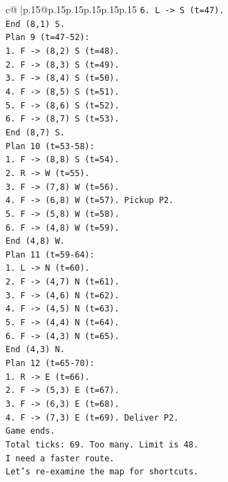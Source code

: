 \documentclass{article}
\begin{document}
{\begin{supertabular}{c@{$\;$}|p{.15\linewidth}@{}p{.15\linewidth}p{.15\linewidth}p{.15\linewidth}p{.15\linewidth}p{.15\linewidth}}
{{{\texttt{6. L {-}> S (t=47).} \\
\texttt{End (8,1) S.} \\
\texttt{Plan 9 (t=47{-}52):} \\
\texttt{1. F {-}> (8,2) S (t=48).} \\
\texttt{2. F {-}> (8,3) S (t=49).} \\
\texttt{3. F {-}> (8,4) S (t=50).} \\
\texttt{4. F {-}> (8,5) S (t=51).} \\
\texttt{5. F {-}> (8,6) S (t=52).} \\
\texttt{6. F {-}> (8,7) S (t=53).} \\
\texttt{End (8,7) S.} \\
\texttt{Plan 10 (t=53{-}58):} \\
\texttt{1. F {-}> (8,8) S (t=54).} \\
\texttt{2. R {-}> W (t=55).} \\
\texttt{3. F {-}> (7,8) W (t=56).} \\
\texttt{4. F {-}> (6,8) W (t=57). Pickup P2.} \\
\texttt{5. F {-}> (5,8) W (t=58).} \\
\texttt{6. F {-}> (4,8) W (t=59).} \\
\texttt{End (4,8) W.} \\
\texttt{Plan 11 (t=59{-}64):} \\
\texttt{1. L {-}> N (t=60).} \\
\texttt{2. F {-}> (4,7) N (t=61).} \\
\texttt{3. F {-}> (4,6) N (t=62).} \\
\texttt{4. F {-}> (4,5) N (t=63).} \\
\texttt{5. F {-}> (4,4) N (t=64).} \\
\texttt{6. F {-}> (4,3) N (t=65).} \\
\texttt{End (4,3) N.} \\
\texttt{Plan 12 (t=65{-}70):} \\
\texttt{1. R {-}> E (t=66).} \\
\texttt{2. F {-}> (5,3) E (t=67).} \\
\texttt{3. F {-}> (6,3) E (t=68).} \\
\texttt{4. F {-}> (7,3) E (t=69). Deliver P2.} \\
\texttt{Game ends.} \\
\texttt{Total ticks: 69. Too many. Limit is 48.} \\
\texttt{I need a faster route.} \\
\texttt{Let's re{-}examine the map for shortcuts.} \\
}}}
\end{supertabular}}
\end{document}
